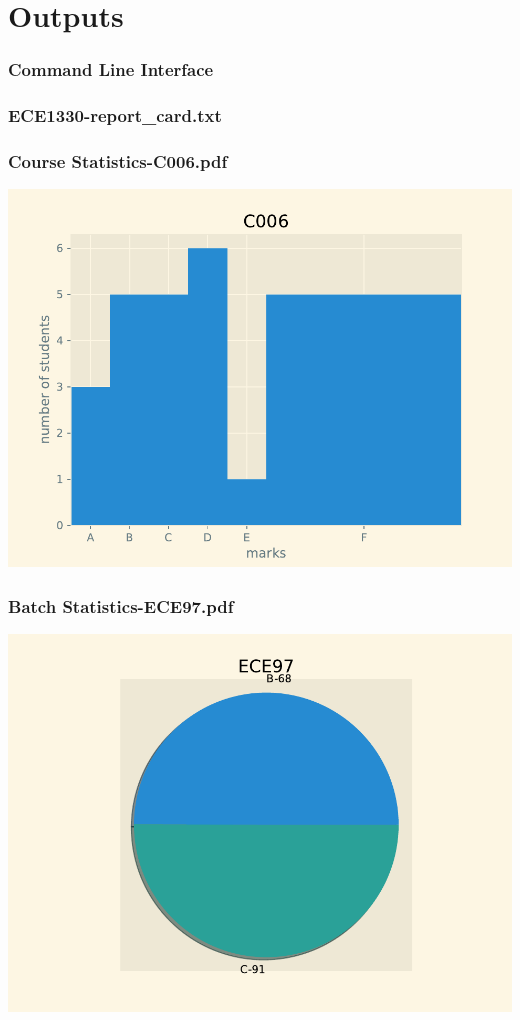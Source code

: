 \documentclass{article}
\begin{document}
\section{Outputs}
	\begin{center}
		\subsubsection*{Command Line Interface}
		\subsubsection*{ECE1330-report\_card.txt}
		\fontsize{10pt}{\baselineskip}\selectfont
		\fontsize{14pt}{\baselineskip}\selectfont
		\subsubsection*{Course Statistics-C006.pdf}
		\includegraphics{outputs/Course Statistics-C006.pdf}
		\subsubsection*{Batch Statistics-ECE97.pdf}
		\includegraphics{outputs/Batch Statistics-ECE97.pdf}

\end{center}
\end{document}
